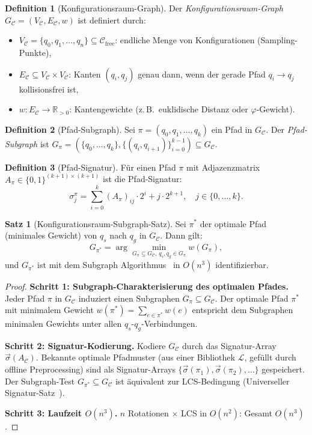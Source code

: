 ﻿\documentclass[a4paper,12pt]{article}
\theoremstyle{definition}
\newtheorem{definition}{Definition}
\newtheorem{satz}{Satz}
\newcommand{\Cspace}{\mathcal{C}}
\newcommand{\Cfree}{\mathcal{C}_{\mathrm{free}}}
\begin{document}
\begin{definition}[Konfigurationsraum-Graph]
\label{def:cspace_graph}
Der \emph{Konfigurationsraum-Graph} $G_{\Cspace} = (V_{\Cspace}, E_{\Cspace}, w)$
ist definiert durch:
\begin{itemize}
    \item $V_{\Cspace} = \{q_0, q_1, \ldots, q_n\} \subseteq \Cfree$:
          endliche Menge von Konfigurationen (Sampling-Punkte),
    \item $E_{\Cspace} \subseteq V_{\Cspace} \times V_{\Cspace}$: Kanten $(q_i, q_j)$
          genau dann, wenn der gerade Pfad $q_i \to q_j$ kollisionsfrei ist,
    \item $w: E_{\Cspace} \to \mathbb{R}_{>0}$: Kantengewichte (z.\,B.\ euklidische
          Distanz oder $\varphi$-Gewicht).
\end{itemize}
\end{definition}

\begin{definition}[Pfad-Subgraph]
Sei $\pi = (q_0, q_1, \ldots, q_k)$ ein Pfad in $G_{\Cspace}$.
Der \emph{Pfad-Subgraph} ist $G_\pi = (\{q_0,\ldots,q_k\}, \{(q_i,q_{i+1})\}_{i=0}^{k-1})
\subseteq G_{\Cspace}$.
\end{definition}

\begin{definition}[Pfad-Signatur]
\label{def:pfad_sig}
F\"ur einen Pfad $\pi$ mit Adjazenzmatrix $A_\pi \in \{0,1\}^{(k+1)\times(k+1)}$
ist die Pfad-Signatur:
\[
\sigma_j^\pi = \sum_{i=0}^{k} (A_\pi)_{ij} \cdot 2^i + j \cdot 2^{k+1},
\quad j \in \{0,\ldots,k\}.
\]
\end{definition}

\begin{satz}[Konfigurationsraum-Subgraph-Satz]
\label{satz:cspace_subgraph}
Sei $\pi^*$ der optimale Pfad (minimales Gewicht) von $q_s$ nach $q_g$ in
$G_{\Cspace}$. Dann gilt:
\[
G_{\pi^*} = \arg\min_{G_\pi \subseteq G_{\Cspace},\, q_s,q_g \in G_\pi} w(G_\pi),
\]
und $G_{\pi^*}$ ist mit dem Subgraph Algorithmus~\cite{epp2026subgraph}
in $O(n^3)$ identifizierbar.
\end{satz}

\begin{proof}
\textbf{Schritt 1: Subgraph-Charakterisierung des optimalen Pfades.}
Jeder Pfad $\pi$ in $G_{\Cspace}$ induziert einen Subgraphen $G_\pi \subseteq G_{\Cspace}$.
Der optimale Pfad $\pi^*$ mit minimalem Gewicht $w(\pi^*) = \sum_{e \in \pi^*} w(e)$
entspricht dem Subgraphen minimalen Gewichts unter allen $q_s$-$q_g$-Verbindungen.

\textbf{Schritt 2: Signatur-Kodierung.}
Kodiere $G_{\Cspace}$ durch das Signatur-Array $\vec{\sigma}(A_{\Cspace})$.
Bekannte optimale Pfadmuster (aus einer Bibliothek $\mathcal{L}$, gef\"ullt
durch offline Preprocessing) sind als Signatur-Arrays $\{\vec{\sigma}(\pi_1),
\vec{\sigma}(\pi_2), \ldots\}$ gespeichert.
Der Subgraph-Test $G_{\pi^*} \subseteq G_{\Cspace}$ ist \"aquivalent zur
LCS-Bedingung (Universeller Signatur-Satz~\cite{epp2026ust}).

\textbf{Schritt 3: Laufzeit $O(n^3)$.}
$n$ Rotationen $\times$ LCS in $O(n^2)$: Gesamt $O(n^3)$.
\end{proof}
\end{document}
